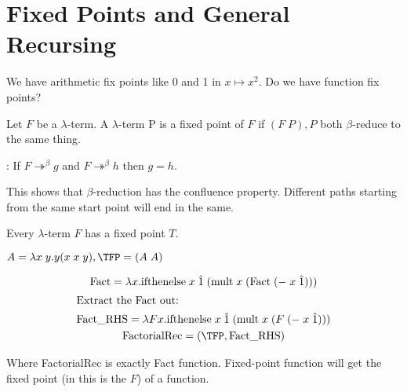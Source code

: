 \section{Fixed Points and General
Recursing}

We have arithmetic fix points like 0 and 1 in \(x \mapsto x^2\). Do we have function fix points?

\begin{definition}
Let \(F\) be a \(\lambda\)-term. A \(\lambda\)-term P is a fixed point of \(F\) if
\((F\;P),P\) both \(\beta\)-reduce to the same thing.
\end{definition}

\begin{theorem}: If \(F \twoheadrightarrow^{\beta} g\)
and \(F \twoheadrightarrow^{\beta} h\) then \(g = h\).
\end{theorem}

This shows that \(\beta\)-reduction has the confluence property. Different paths
starting from the same start point will end in the same.

\begin{theorem}
 Every \(\lambda\)-term \(F\) has a fixed point \(T\).
\end{theorem}

\begin{definition}
\(A = \lambda x\;y.y(x\;x\;y), \TFP = (A\;A)\)
\end{definition}

\begin{example}
\begin{gather*}
  \text{Fact} = \lambda x. \text{ifthenelse}\;x\;\hat{1}\;(\text{mult}\;x\; (\text{Fact}\;(-\;x\;\hat{1})))\\
  \intertext{\centering Extract the Fact out:}
  \text{Fact\_RHS} = \lambda F x. \text{ifthenelse}\;x\;\hat{1}\;(\text{mult}\; x\;(F\;(-\;x\;\hat{1})))\\
  \text{FactorialRec} = (\TFP, \text{Fact\_RHS})
\end{gather*}
\end{example}

Where FactorialRec is exactly Fact function. Fixed-point function will get the fixed point (in this is the $F$) of a function.